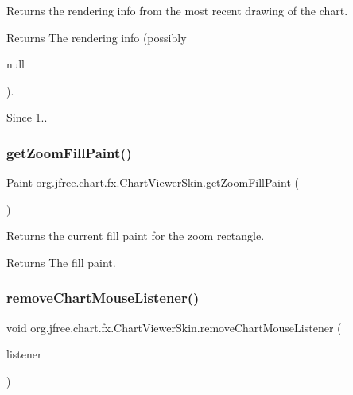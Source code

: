 Returns the rendering info from the most recent drawing of the chart.

\begin{DoxyReturn}{Returns}
The rendering info (possibly
\begin{DoxyCode}
null 
\end{DoxyCode}
 ).
\end{DoxyReturn}
\begin{DoxySince}{Since}
1.. 
\end{DoxySince}
\mbox{\label{classorg_1_1jfree_1_1chart_1_1fx_1_1_chart_viewer_skin_ad9ee5c9e849a9af70debddcbae0de4e4}} 
\subsubsection{\texorpdfstring{get\+Zoom\+Fill\+Paint()}{getZoomFillPaint()}}
{\footnotesize\ttfamily Paint org.\+jfree.\+chart.\+fx.\+Chart\+Viewer\+Skin.\+get\+Zoom\+Fill\+Paint (\begin{DoxyParamCaption}{ }\end{DoxyParamCaption})}

Returns the current fill paint for the zoom rectangle.

\begin{DoxyReturn}{Returns}
The fill paint. 
\end{DoxyReturn}
\mbox{\label{classorg_1_1jfree_1_1chart_1_1fx_1_1_chart_viewer_skin_a44c6131f43a641a3dff487c44b014dd6}} 
\subsubsection{\texorpdfstring{remove\+Chart\+Mouse\+Listener()}{removeChartMouseListener()}}
{\footnotesize\ttfamily void org.\+jfree.\+chart.\+fx.\+Chart\+Viewer\+Skin.\+remove\+Chart\+Mouse\+Listener (\begin{DoxyParamCaption}\item[{\mbox{\hyperlink{interfaceorg_1_1jfree_1_1chart_1_1fx_1_1interaction_1_1_chart_mouse_listener_f_x}{Chart\+Mouse\+Listener\+FX}}}]{listener }\end{DoxyParamCaption})}

